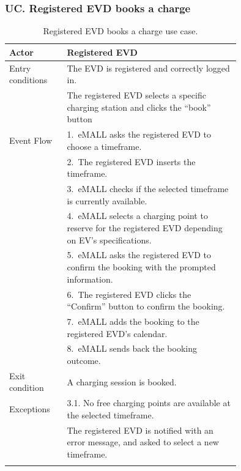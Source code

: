 \subsubsection*{UC\cuc . Registered EVD books a charge}
\begin{center}
    \begin{longtable}{lp{0.75\linewidth}}
        \hline
        Actor            & Registered EVD                                                                                         \\
        \hline
        Entry conditions & The EVD is registered and correctly logged in.                                                         \\
        & The registered EVD selects a specific charging station and clicks the ``book'' button                  \\
        \hline
        Event Flow       & 1.\ eMALL asks the registered EVD to choose a timeframe.                                               \\
        & 2.\ The registered EVD inserts the timeframe.                                                          \\
        & 3.\ eMALL checks if the selected timeframe is currently available.                                     \\
        & 4.\ eMALL selects a charging point to reserve for the registered EVD depending on EV's specifications. \\
        & 5.\ eMALL asks the registered EVD to confirm the booking with the prompted information.                \\
        & 6.\ The registered EVD clicks the ``Confirm'' button to confirm the booking.                           \\
        & 7.\ eMALL adds the booking to the registered EVD's calendar.                                           \\
        & 8.\ eMALL sends back the booking outcome.                                                              \\
        \hline
        Exit condition   & A charging session is booked.                                                                          \\
        \hline
        Exceptions       & 3.1. No free charging points are available at the selected timeframe.                                  \\
        & The registered EVD is notified with an error message, and asked to select a new timeframe.             \\
        \hline
        \caption{Registered EVD books a charge use case.}
        \label{tab: EVD_booking_use_case}
    \end{longtable}


\end{center}
